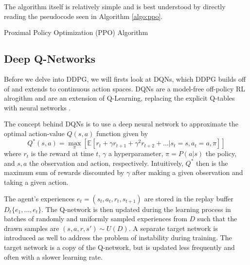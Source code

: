 The algorithm itself is relatively simple and is best understood by directly reading the pseudocode seen in Algorithm \ref{algo:ppo}.

\begin{algorithm}
	\SetAlgoLined
	\caption{Proximal Policy Optimization (PPO) Algorithm}\label{algo:ppo}
\end{algorithm}

\subsection{Deep Q-Networks}

Before we delve into DDPG, we will firsts look at DQNs, which DDPG builds off of and extends to continuous action spaces.
DQNs are a model-free off-policy RL alrogithm and are an extension of Q-Learning, replacing the explicit Q-tables with neural networks \cite{watkins1989learning,mnih2015human}.

The concept behind DQNs is to use a deep neural network to approximate the optimal action-value $Q (s, a)$ function given by
\begin{equation}
	Q^* (s, a) = \underset{\pi}{\max}\left[ \mathbb{E}\left[r_t + \gamma r_{t+1} + \gamma^2 r_{t+2} + \ldots | s_t=s, a_t=a, \pi\right]\right]
\end{equation}
where $r_t$ is the reward at time $t$, $\gamma$ a hyperparameter, $\pi=P(a|s)$ the policy, and $s, a$ the observation and action, respectively.
Intuitively, $Q^*$ then is the maximum sum of rewards discounted by $\gamma$ after making a given observation and taking a given action.

The agent's experiences $e_t = (s_t, a_t, r_t, s_{t+1})$ are stored in the replay buffer $D_t\{e_1,\ldots,e_t\}$.
The Q-network is then updated during the learning process in batches of randomly and uniformly sampled experiences from $D$ such that the drawn samples are $(s,a,r,s') \sim U(D)$.
A separate target network is introduced as well to address the problem of instability during training.
The target network is a copy of the Q-network, but is updated less frequently and often with a slower learning rate.

